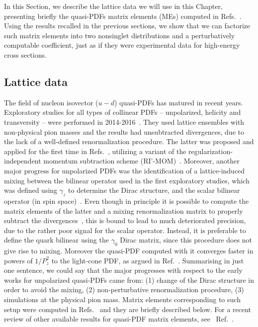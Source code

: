 In this Section, we describe the lattice data we will use in this Chapter, presenting
briefly the quasi-PDFs matrix elements (MEs) computed in
Refs.~\cite{Alexandrou:2018pbm, Alexandrou:2019lfo}. Using the results recalled
in the previous sections, we show that we can factorize such matrix
elements into two nonsinglet distributions and a perturbatively computable
coefficient, just as if they were experimental data for high-energy cross
sections.

\subsection{Lattice data}
\label{subsec:latticedata}
The field of nucleon isovector ($u-d$) quasi-PDFs has matured in recent years.
Exploratory studies for all types of collinear PDFs -- unpolarized, helicity and
transversity -- were performed in
2014-2016~\cite{Lin:2014zya,Alexandrou:2015rja,Chen:2016utp,Alexandrou:2016jqi}.
They used lattice ensembles with non-physical pion masses and the results had
unsubtracted divergences, due to the lack of a well-defined renormalization
procedure. The latter was proposed and applied for the first time in
Refs.~\cite{Constantinou:2017sej,Alexandrou:2017huk}, utilizing a variant of the
regularization-independent momentum subtraction scheme
(RI'-MOM)~\cite{Martinelli:1994ty}. Moreover, another major progress for
unpolarized PDFs was the identification of a lattice-induced mixing between the
bilinear operator used in the first exploratory studies, which was defined using
$\gamma_z$ to determine the Dirac structure, and the scalar bilinear operator
(in spin space)~\cite{Constantinou:2017sej}. Even though in principle it is
possible to compute the matrix elements of the latter and a mixing
renormalization matrix to properly subtract the
divergences~\cite{Alexandrou:2017huk}, this is bound to lead to much
deteriorated precision, due to the rather poor signal for the scalar operator.
Instead, it is preferable to define the quark bilinear using the $\gamma_0$
Dirac matrix, since this procedure does not give rise to mixing. Moreover the
quasi-PDF computed with it converges faster in powers of $1/P_z^2$ to the
light-cone PDF, as argued in Ref.~\cite{Radyushkin:2016hsy}. Summarising in just
one sentence, we could say that the major progresses with respect to the early
works for unpolarized quasi-PDFs came from: (1) change of the Dirac structure in
order to avoid the mixing, (2) non-perturbative renormalization procedure, (3)
simulations at the physical pion mass. Matrix elements corresponding to such
setup were computed in Refs.~\cite{Alexandrou:2018pbm,Alexandrou:2019lfo,Chen:2018xof} and they are briefly
described below. For a recent review of other available results for quasi-PDF
matrix elements, see \eg\ Ref.~\cite{Cichy:2018mum}. 

